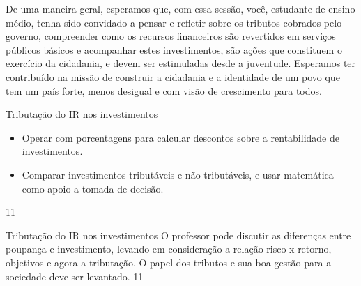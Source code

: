 De uma maneira geral, esperamos que, com essa sessão, você, estudante de ensino médio, tenha sido convidado a pensar e refletir sobre os tributos cobrados pelo governo, compreender como os recursos financeiros são revertidos em serviços públicos básicos e acompanhar estes investimentos, são ações que constituem o exercício da cidadania, e devem ser  estimuladas desde a juventude. Esperamos ter contribuído na missão de construir a cidadania e a identidade de um povo que tem um país forte, menos desigual e com visão de crescimento para todos.

\clearpage
\def\currentcolor{session2}
\begin{objectives}{Tributação do IR nos investimentos}
{
\begin{itemize}
\item Operar com porcentagens para calcular descontos sobre a rentabilidade de investimentos.
\item Comparar investimentos tributáveis e não tributáveis, e usar matemática como apoio a tomada de decisão.
\end{itemize}
}{1}{1}
\end{objectives}
\begin{sugestions}{Tributação do IR nos investimentos}
{
O professor pode discutir as diferenças entre poupança e investimento, levando em consideração a relação risco x retorno, objetivos e agora a tributação. O papel dos tributos e sua boa gestão para a sociedade deve ser levantado.
}{1}{1}
\end{sugestions}
